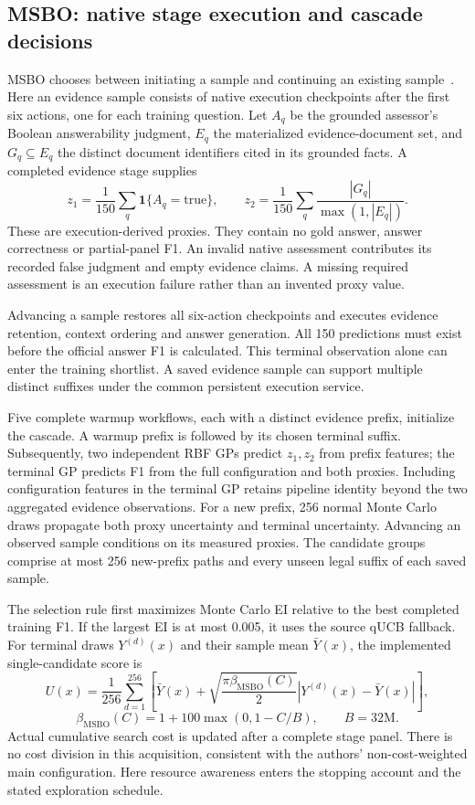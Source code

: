 \subsection{MSBO: native stage execution and cascade decisions}
\label{sec:msbo-rag-adapter}
MSBO chooses between initiating a sample and continuing an existing
sample~\citep{torresi2026multistage}. Here an evidence sample consists of
native execution checkpoints after the first six actions, one for each
training question. Let $A_q$ be the grounded assessor's Boolean
answerability judgment, $E_q$ the materialized evidence-document set, and
$G_q\subseteq E_q$ the distinct document identifiers cited in its grounded
facts. A completed evidence stage supplies
\[
 z_1=\frac{1}{150}\sum_q\mathbf{1}\{A_q=\mathrm{true}\},\qquad
 z_2=\frac{1}{150}\sum_q\frac{|G_q|}{\max(1,|E_q|)}.
\]
These are execution-derived proxies. They contain no gold answer, answer
correctness or partial-panel F1. An invalid native assessment contributes
its recorded false judgment and empty evidence claims. A missing required
assessment is an execution failure rather than an invented proxy value.

Advancing a sample restores all six-action checkpoints and executes evidence
retention, context ordering and answer generation. All 150 predictions must
exist before the official answer F1 is calculated. This terminal observation
alone can enter the training shortlist. A saved evidence sample can support
multiple distinct suffixes under the common persistent execution service.

Five complete warmup workflows, each with a distinct evidence prefix,
initialize the cascade. A warmup prefix is followed by its chosen terminal
suffix. Subsequently, two independent RBF GPs predict $z_1,z_2$ from prefix
features; the terminal GP predicts F1 from the full configuration and both
proxies. Including configuration features in the terminal GP retains
pipeline identity beyond the two aggregated evidence observations. For a
new prefix, 256 normal Monte Carlo draws propagate both proxy uncertainty
and terminal uncertainty. Advancing an observed sample conditions on its
measured proxies. The candidate groups comprise at most 256 new-prefix
paths and every unseen legal suffix of each saved sample.

The selection rule first maximizes Monte Carlo EI relative to the best
completed training F1. If the largest EI is at most 0.005, it uses the
source qUCB fallback. For terminal draws $Y^{(d)}(x)$ and their sample mean
$\bar Y(x)$, the implemented single-candidate score is
\[
 U(x)=\frac{1}{256}\sum_{d=1}^{256}
 \left[\bar Y(x)+\sqrt{\frac{\pi\beta_{\mathrm{MSBO}}(C)}{2}}
                   |Y^{(d)}(x)-\bar Y(x)|\right],
\]
\[
 \beta_{\mathrm{MSBO}}(C)=1+100\max(0,1-C/B),\qquad B=32\mathrm{M}.
\]
Actual cumulative search cost is updated after a complete stage panel.
There is no cost division in this acquisition, consistent with the
authors' non-cost-weighted main configuration. Here resource awareness
enters the stopping account and the stated exploration schedule.


